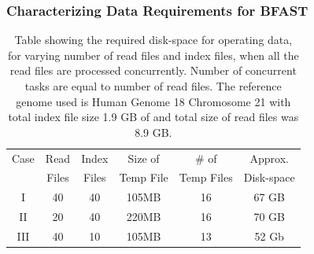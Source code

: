 \documentclass{cpeauth}
\begin{document}


 
\subsubsection{Characterizing Data Requirements for BFAST}




\begin{table}
 \begin{tabular}{|c|c|c|c|c|c|} 
 \hline 
Case &Read& Index& Size of&  \# of & Approx.  \\
 &Files &  Files  & Temp File & Temp Files & Disk-space\\
 \hline
I&40 & 40 &105MB & 16 &67 GB \\
II&20 & 40 & 220MB & 16 &70 GB \\
III&40 & 10 & 105MB & 13 &52 Gb \\ 
 \hline
 \end{tabular}

 \caption{Table showing the required disk-space for operating data,
   for varying number of read files and index files, when all the read
   files are processed concurrently.  Number of concurrent tasks are
   equal to number of read files. The reference genome used is Human
   Genome 18 Chromosome 21 with total index file size 1.9 GB of and
   total size of read files was 8.9 GB.}
    \label{table:dynamic-diskspace} 
\end{table}
\end{document}
